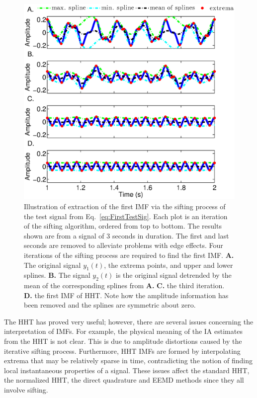 \documentclass[a4paper]{IEEEtran}
\begin{document}
\begin{figure}
\begin{center}
 \includegraphics[scale=0.42]{./Figures/HHTDemo.eps}
 \caption[HHTDemo]{Illustration of extraction of the first IMF via the sifting process of the test signal from Eq.~\ref{eq:FirstTestSig}. Each plot is an iteration of the sifting algorithm, ordered from top to bottom. The results shown are from a signal of 3 seconds in duration. The first and last seconds are removed to alleviate problems with edge effects. Four iterations of the sifting process are required to find the first IMF. \textbf{A.} The original signal $y_1(t)$, the extrema points, and upper and lower splines. \textbf{B.} The signal $y_2(t)$ is the original signal detrended by the mean of the corresponding splines from \textbf{A.} \textbf{C.} the third iteration. \textbf{D.} the first IMF of HHT. Note how the amplitude information has been removed and the splines are symmetric about zero.}
\label{fig:HHTDemo}
\end{center}
\end{figure}

The HHT has proved very useful; however, there are several issues concerning the interpretation of IMFs. For example, the physical meaning of the IA estimates from the HHT is not clear. This is due to amplitude distortions caused by the iterative sifting process. Furthermore, HHT IMFs are formed by interpolating extrema that may be relatively sparse in time, contradicting the notion of finding local instantaneous properties of a signal. These issues affect the standard HHT, the normalized HHT, the direct quadrature and EEMD methods since they all involve sifting. 
\end{document}
